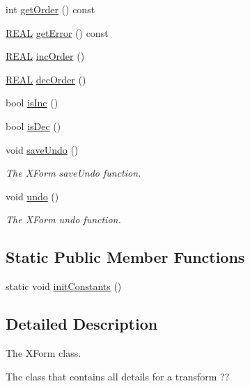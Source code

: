 \begin{DoxyCompactItemize}
\item 
int \hyperlink{classCXForm_afb77c0beb4e49769b0eadb717b2d1179}{get\-Order} () const 
\item 
\hyperlink{util_8h_a5821460e95a0800cf9f24c38915cbbde}{R\-E\-A\-L} \hyperlink{classCXForm_aa25c50b2811830ca8e54853a143e5dde}{get\-Error} () const 
\item 
\hyperlink{util_8h_a5821460e95a0800cf9f24c38915cbbde}{R\-E\-A\-L} \hyperlink{classCXForm_a094937703c2d67ef29f5c12fbc65b438}{inc\-Order} ()
\item 
\hyperlink{util_8h_a5821460e95a0800cf9f24c38915cbbde}{R\-E\-A\-L} \hyperlink{classCXForm_a903c633f1ac0756230bcd383e35a1d85}{dec\-Order} ()
\item 
bool \hyperlink{classCXForm_a9b085759beff4d834e56969eb01b7020}{is\-Inc} ()
\item 
bool \hyperlink{classCXForm_a14ededb4bf28f12d9f6525fa5758102d}{is\-Dec} ()
\item 
void \hyperlink{classCXForm_a706bcfdd32f029320524aaa7cbb1427e}{save\-Undo} ()
\begin{DoxyCompactList}\small\item\em The X\-Form save\-Undo function. \end{DoxyCompactList}\item 
void \hyperlink{classCXForm_af7feb93ddf2cd2df187b35b565658d3d}{undo} ()
\begin{DoxyCompactList}\small\item\em The X\-Form undo function. \end{DoxyCompactList}\end{DoxyCompactItemize}
\subsection*{Static Public Member Functions}
\begin{DoxyCompactItemize}
\item 
static void \hyperlink{classCXForm_a69329814cc3fdf98afabaebb57305886}{init\-Constants} ()
\end{DoxyCompactItemize}


\subsection{Detailed Description}
The X\-Form class. 

The class that contains all details for a transform ?? 

